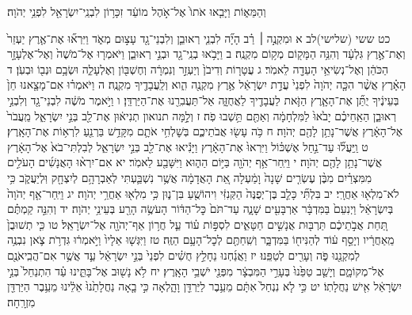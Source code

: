 \documentclass[twoside, openany, parskip=half, 11pt]{book}
\begin{document}
וְהַמֵּא֑וֹת וַיָּבִ֤אוּ אֹתוֹ֙ אֶל־אֹ֣הֶל מוֹעֵ֔ד זִכָּר֥וֹן לִבְנֵֽי־יִשְׂרָאֵ֖ל לִפְנֵ֥י יְהֹוָה׃

כט ששי (שלישי)לב א וּמִקְנֶ֣ה ׀ רַ֗ב הָיָ֞ה לִבְנֵ֧י רְאוּבֵ֛ן וְלִבְנֵי־גָ֖ד עָצ֣וּם מְאֹ֑ד וַיִּרְא֞וּ אֶת־אֶ֤רֶץ יַעְזֵר֙ וְאֶת־אֶ֣רֶץ גִּלְעָ֔ד וְהִנֵּ֥ה הַמָּק֖וֹם מְק֥וֹם מִקְנֶֽה׃ ב וַיָּבֹ֥אוּ בְנֵֽי־גָ֖ד וּבְנֵ֣י רְאוּבֵ֑ן וַיֹּאמְר֤וּ אֶל־מֹשֶׁה֙ וְאֶל־אֶלְעָזָ֣ר הַכֹּהֵ֔ן וְאֶל־נְשִׂיאֵ֥י הָעֵדָ֖ה לֵאמֹֽר׃ ג עֲטָר֤וֹת וְדִיבֹן֙ וְיַעְזֵ֣ר וְנִמְרָ֔ה וְחֶשְׁבּ֖וֹן וְאֶלְעָלֵ֑ה וּשְׂבָ֥ם וּנְב֖וֹ וּבְעֹֽן׃ ד הָאָ֗רֶץ אֲשֶׁ֨ר הִכָּ֤ה יְהֹוָה֙ לִפְנֵי֙ עֲדַ֣ת יִשְׂרָאֵ֔ל אֶ֥רֶץ מִקְנֶ֖ה הִ֑וא וְלַֽעֲבָדֶ֖יךָ מִקְנֶֽה׃
ה וַיֹּאמְר֗וּ אִם־מָצָ֤אנוּ חֵן֙ בְּעֵינֶ֔יךָ יֻתַּ֞ן אֶת־הָאָ֧רֶץ הַזֹּ֛את לַעֲבָדֶ֖יךָ לַאֲחֻזָּ֑ה אַל־תַּעֲבִרֵ֖נוּ אֶת־הַיַּרְדֵּֽן׃ ו וַיֹּ֣אמֶר מֹשֶׁ֔ה לִבְנֵי־גָ֖ד וְלִבְנֵ֣י רְאוּבֵ֑ן הַאַֽחֵיכֶ֗ם יָבֹ֙אוּ֙ לַמִּלְחָמָ֔ה וְאַתֶּ֖ם תֵּ֥שְׁבוּ פֹֽה׃ ז וְלָ֣מָּה תנואון תְנִיא֔וּן אֶת־לֵ֖ב בְּנֵ֣י יִשְׂרָאֵ֑ל מֵֽעֲבֹר֙ אֶל־הָאָ֔רֶץ אֲשֶׁר־נָתַ֥ן לָהֶ֖ם יְהֹוָה׃ ח כֹּ֥ה עָשׂ֖וּ אֲבֹתֵיכֶ֑ם בְּשׇׁלְחִ֥י אֹתָ֛ם מִקָּדֵ֥שׁ בַּרְנֵ֖עַ לִרְא֥וֹת אֶת־הָאָֽרֶץ׃ ט וַֽיַּעֲל֞וּ עַד־נַ֣חַל אֶשְׁכּ֗וֹל וַיִּרְאוּ֙ אֶת־הָאָ֔רֶץ וַיָּנִ֕יאוּ אֶת־לֵ֖ב בְּנֵ֣י יִשְׂרָאֵ֑ל לְבִלְתִּי־בֹא֙ אֶל־הָאָ֔רֶץ אֲשֶׁר־נָתַ֥ן לָהֶ֖ם יְהֹוָה׃ י וַיִּֽחַר־אַ֥ף יְהֹוָ֖ה בַּיּ֣וֹם הַה֑וּא וַיִּשָּׁבַ֖ע לֵאמֹֽר׃ יא אִם־יִרְא֨וּ הָאֲנָשִׁ֜ים הָעֹלִ֣ים מִמִּצְרַ֗יִם מִבֶּ֨ן עֶשְׂרִ֤ים שָׁנָה֙ וָמַ֔עְלָה אֵ֚ת הָאֲדָמָ֔ה אֲשֶׁ֥ר נִשְׁבַּ֛עְתִּי לְאַבְרָהָ֥ם לְיִצְחָ֖ק וּֽלְיַעֲקֹ֑ב כִּ֥י לֹא־מִלְא֖וּ אַחֲרָֽי׃ יב בִּלְתִּ֞י כָּלֵ֤ב בֶּן־יְפֻנֶּה֙ הַקְּנִזִּ֔י וִיהוֹשֻׁ֖עַ בִּן־נ֑וּן כִּ֥י מִלְא֖וּ אַחֲרֵ֥י יְהֹוָה׃ יג וַיִּֽחַר־אַ֤ף יְהֹוָה֙ בְּיִשְׂרָאֵ֔ל וַיְנִעֵם֙ בַּמִּדְבָּ֔ר אַרְבָּעִ֖ים שָׁנָ֑ה עַד־תֹּם֙ כׇּל־הַדּ֔וֹר הָעֹשֶׂ֥ה הָרַ֖ע בְּעֵינֵ֥י יְהֹוָה׃ יד וְהִנֵּ֣ה קַמְתֶּ֗ם תַּ֚חַת אֲבֹ֣תֵיכֶ֔ם תַּרְבּ֖וּת אֲנָשִׁ֣ים חַטָּאִ֑ים לִסְפּ֣וֹת ע֗וֹד עַ֛ל חֲר֥וֹן אַף־יְהֹוָ֖ה אֶל־יִשְׂרָאֵֽל׃ טו כִּ֤י תְשׁוּבֻן֙ מֵֽאַחֲרָ֔יו וְיָסַ֣ף ע֔וֹד לְהַנִּיח֖וֹ בַּמִּדְבָּ֑ר וְשִֽׁחַתֶּ֖ם לְכׇל־הָעָ֥ם הַזֶּֽה׃
טז וַיִּגְּשׁ֤וּ אֵלָיו֙ וַיֹּ֣אמְר֔וּ גִּדְרֹ֥ת צֹ֛אן נִבְנֶ֥ה לְמִקְנֵ֖נוּ פֹּ֑ה וְעָרִ֖ים לְטַפֵּֽנוּ׃ יז וַאֲנַ֜חְנוּ נֵחָלֵ֣ץ חֻשִׁ֗ים לִפְנֵי֙ בְּנֵ֣י יִשְׂרָאֵ֔ל עַ֛ד אֲשֶׁ֥ר אִם־הֲבִֽיאֹנֻ֖ם אֶל־מְקוֹמָ֑ם וְיָשַׁ֤ב טַפֵּ֙נוּ֙ בְּעָרֵ֣י הַמִּבְצָ֔ר מִפְּנֵ֖י יֹשְׁבֵ֥י הָאָֽרֶץ׃ יח לֹ֥א נָשׁ֖וּב אֶל־בָּתֵּ֑ינוּ עַ֗ד הִתְנַחֵל֙ בְּנֵ֣י יִשְׂרָאֵ֔ל אִ֖ישׁ נַחֲלָתֽוֹ׃ יט כִּ֣י לֹ֤א נִנְחַל֙ אִתָּ֔ם מֵעֵ֥בֶר לַיַּרְדֵּ֖ן וָהָ֑לְאָה כִּ֣י בָ֤אָה נַחֲלָתֵ֙נוּ֙ אֵלֵ֔ינוּ מֵעֵ֥בֶר הַיַּרְדֵּ֖ן מִזְרָֽחָה׃
\end{document}
